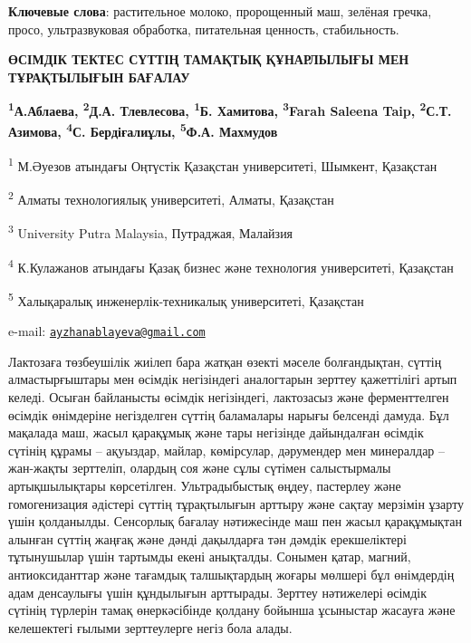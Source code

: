 {\bfseries Ключевые слова}: растительное молоко, пророщенный маш, зелёная
гречка, просо, ультразвуковая обработка, питательная ценность,
стабильность.

\begin{articleheader}
{\bfseries ӨСІМДІК ТЕКТЕС СҮТТІҢ ТАМАҚТЫҚ ҚҰНАРЛЫЛЫҒЫ МЕН ТҰРАҚТЫЛЫҒЫН БАҒАЛАУ}

{\bfseries
\textsuperscript{1}А.Аблаева\textsuperscript{\envelope },
\textsuperscript{2}Д.А. Тлевлесова,
\textsuperscript{1}Б. Хамитова,
\textsuperscript{3}Farah Saleena Taip,
\textsuperscript{2}С.Т. Азимова,
\textsuperscript{4}С. Бердіғалиұлы,
\textsuperscript{5}Ф.А. Махмудов
}
\end{articleheader}

\begin{affiliation}
\textsuperscript{1} М.Әуезов атындағы Оңтүстік Қазақстан университеті,
Шымкент, Қазақстан

\textsuperscript{2} Алматы технологиялық университеті, Алматы, Қазақстан

\textsuperscript{3} University Putra Malaysia, Путраджая, Малайзия

\textsuperscript{4} К.Кулажанов атындағы Қазақ бизнес және технология
университеті, Қазақстан

\textsuperscript{5} Халықаралық инженерлік-техникалық университеті,
Қазақстан

e-mail: \href{mailto:ayzhanablayeva@gmail.com}{\nolinkurl{ayzhanablayeva@gmail.com}}
\end{affiliation}

Лактозаға төзбеушілік жиілеп бара жатқан өзекті мәселе болғандықтан,
сүттің алмастырғыштары мен өсімдік негізіндегі аналогтарын зерттеу
қажеттілігі артып келеді. Осыған байланысты өсімдік негізіндегі,
лактозасыз және ферменттелген өсімдік өнімдеріне негізделген сүттің
баламалары нарығы белсенді дамуда. Бұл мақалада маш, жасыл қарақұмық
және тары негізінде дайындалған өсімдік сүтінің құрамы -- ақуыздар,
майлар, көмірсулар, дәрумендер мен минералдар -- жан-жақты зерттеліп,
олардың соя және сұлы сүтімен салыстырмалы артықшылықтары көрсетілген.
Ультрадыбыстық өңдеу, пастерлеу және гомогенизация әдістері сүттің
тұрақтылығын арттыру және сақтау мерзімін ұзарту үшін қолданылды.
Сенсорлық бағалау нәтижесінде маш пен жасыл қарақұмықтан алынған сүттің
жаңғақ және дәнді дақылдарға тән дәмдік ерекшеліктері тұтынушылар үшін
тартымды екені анықталды. Сонымен қатар, магний, антиоксиданттар және
тағамдық талшықтардың жоғары мөлшері бұл өнімдердің адам денсаулығы үшін
құндылығын арттырады. Зерттеу нәтижелері өсімдік сүтінің түрлерін тамақ
өнеркәсібінде қолдану бойынша ұсыныстар жасауға және келешектегі ғылыми
зерттеулерге негіз бола алады.

